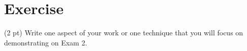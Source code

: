 %
%
\section{Exercise}

(2 pt) Write one aspect of your work or one technique that you will focus on demonstrating on Exam 2.